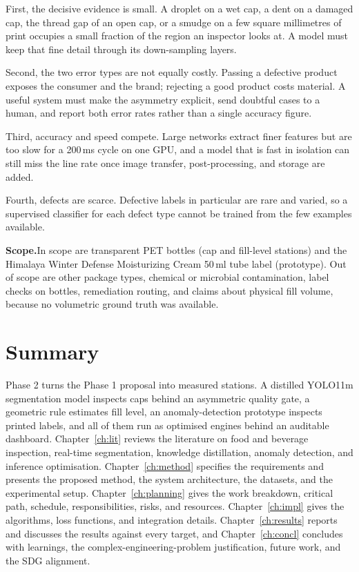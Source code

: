 First, the decisive evidence is small. A droplet on a wet cap, a dent on a damaged cap, the thread gap of an open cap, or a smudge on a few square millimetres of print occupies a small fraction of the region an inspector looks at. A model must keep that fine detail through its down-sampling layers.

Second, the two error types are not equally costly. Passing a defective product exposes the consumer and the brand; rejecting a good product costs material. A useful system must make the asymmetry explicit, send doubtful cases to a human, and report both error rates rather than a single accuracy figure.

Third, accuracy and speed compete. Large networks extract finer features but are too slow for a 200\,ms cycle on one GPU, and a model that is fast in isolation can still miss the line rate once image transfer, post-processing, and storage are added.

Fourth, defects are scarce. Defective labels in particular are rare and varied, so a supervised classifier for each defect type cannot be trained from the few examples available.

\noindent\textbf{Scope.}\label{sec:scope}In scope are transparent PET bottles (cap and fill-level stations) and the Himalaya Winter Defense Moisturizing Cream 50\,ml tube label (prototype). Out of scope are other package types, chemical or microbial contamination, label checks on bottles, remediation routing, and claims about physical fill volume, because no volumetric ground truth was available.

\section{Summary}
\label{sec:intro-summary}

Phase 2 turns the Phase 1 proposal into measured stations. A distilled YOLO11m segmentation model inspects caps behind an asymmetric quality gate, a geometric rule estimates fill level, an anomaly-detection prototype inspects printed labels, and all of them run as optimised engines behind an auditable dashboard. Chapter~\ref{ch:lit} reviews the literature on food and beverage inspection, real-time segmentation, knowledge distillation, anomaly detection, and inference optimisation. Chapter~\ref{ch:method} specifies the requirements and presents the proposed method, the system architecture, the datasets, and the experimental setup. Chapter~\ref{ch:planning} gives the work breakdown, critical path, schedule, responsibilities, risks, and resources. Chapter~\ref{ch:impl} gives the algorithms, loss functions, and integration details. Chapter~\ref{ch:results} reports and discusses the results against every target, and Chapter~\ref{ch:concl} concludes with learnings, the complex-engineering-problem justification, future work, and the SDG alignment.
